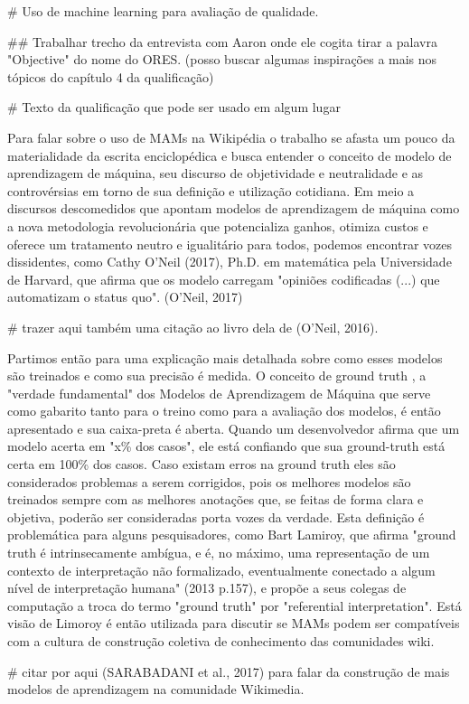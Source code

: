 # Uso de machine learning para avaliação de qualidade.

## Trabalhar trecho da entrevista com Aaron onde ele cogita tirar a palavra "Objective" do nome do ORES. (posso buscar algumas inspirações a mais nos tópicos do capítulo 4 da qualificação)

# Texto da qualificação que pode ser usado em algum lugar

Para falar sobre o uso de MAMs na Wikipédia o trabalho se afasta um pouco da materialidade da escrita enciclopédica e busca entender o conceito de modelo de aprendizagem de máquina, seu discurso de objetividade e neutralidade e as controvérsias em torno de sua definição e utilização cotidiana. Em meio a discursos descomedidos que apontam modelos de aprendizagem de máquina como a nova metodologia revolucionária que potencializa ganhos, otimiza custos e oferece um tratamento neutro e igualitário para todos, podemos encontrar vozes dissidentes, como Cathy O'Neil (2017), Ph.D. em matemática pela Universidade de Harvard, que afirma que os modelo carregam "opiniões codificadas (...) que automatizam o status quo". (O'Neil, 2017)

# trazer aqui também uma citação ao livro dela de (O'Neil, 2016).

Partimos então para uma explicação mais detalhada sobre como esses modelos são treinados e como sua precisão é medida. O conceito de ground truth , a "verdade fundamental" dos Modelos de Aprendizagem de Máquina que serve como gabarito tanto para o treino como para a avaliação dos modelos, é então apresentado e sua caixa-preta é aberta. Quando um desenvolvedor afirma que um modelo acerta em "x\% dos casos", ele está confiando que sua ground-truth está certa em 100\% dos casos. Caso existam erros na ground truth eles são considerados problemas a serem corrigidos, pois os melhores modelos são treinados sempre com as melhores anotações que, se feitas de forma clara e objetiva, poderão ser consideradas porta vozes da verdade. Esta definição é problemática para alguns pesquisadores, como Bart Lamiroy, que afirma "ground truth é intrinsecamente ambígua, e é, no máximo, uma representação de um contexto de interpretação não formalizado, eventualmente conectado a algum nível de interpretação humana" (2013 p.157), e propõe a seus colegas de computação a troca do termo "ground truth" por "referential interpretation". Está visão de Limoroy é então utilizada para discutir se MAMs podem ser compatíveis com a cultura de construção coletiva de conhecimento das comunidades wiki.

# citar por aqui (SARABADANI et al., 2017) para falar da construção de mais modelos de aprendizagem na comunidade Wikimedia.